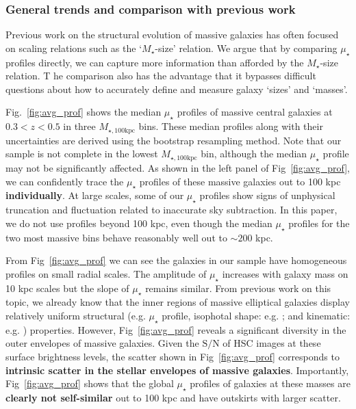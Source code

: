 \documentclass[fleqn,usenatbib]{mnras}
\def\mstar{{$M_{\star}$}}
\def\mtot{{$M_{\star,100\mathrm{kpc}}$}}
\def\s2n{{$\mathrm{S}/\mathrm{N}$}}
\def\mden{{$\mu_{\star}$}}
\begin{document}
\subsubsection{General trends and comparison with previous work}
    \label{sssec:sbp_inter}
   
    Previous work on the structural evolution of massive galaxies has often focused on 
    scaling relations such as the `\mstar{}-size' relation.  
    We argue that by comparing \mden{} profiles directly, we can capture more 
    information than afforded by the \mstar{}-size relation. T
    he comparison also has the advantage that it bypasses difficult questions about 
    how to accurately define and measure galaxy `sizes' and `masses'.
    
    Fig.~\ref{fig:avg_prof} shows the median \mden{} profiles of massive central 
    galaxies at $0.3 < z < 0.5$ in three \mtot{} bins.
    These median profiles along with their uncertainties are derived using the 
    bootstrap resampling method. 
    Note that our sample is not complete in the lowest \mtot{} bin, although the 
    median \mden{} profile may not be significantly affected. 
    As shown in the left panel of Fig~\ref{fig:avg_prof}, we can confidently trace
    the \mden{} profiles of these massive galaxies out to 100 kpc 
    \textbf{individually}.  
    At large scales, some of our \mden{} profiles show signs of unphysical truncation 
    and fluctuation related to inaccurate sky subtraction. 
    In this paper, we do not use profiles beyond 100 kpc, even though the median 
    \mden{} profiles for the two most massive bins behave reasonably well out to 
    ${\sim} 200$ kpc. 
       
    From Fig~\ref{fig:avg_prof} we can see the galaxies in our sample have 
    homogeneous profiles on small radial scales. 
    The amplitude of \mden{} increases with galaxy mass on 10 kpc scales but the 
    slope of \mden{} remains similar.  
    From previous work on this topic, we already know that the inner regions of 
    massive elliptical galaxies display relatively uniform structural (e.g.
    \mden{} profile, isophotal shape: e.g. \citealt{Lauer07, Kormendy2009, 
    Schombert2015}; and kinematic: e.g. \citealt{Cappellari13b}) properties.  
    However, Fig~\ref{fig:avg_prof} reveals a significant diversity in the outer 
    envelopes of massive galaxies.  
    Given the \s2n{} of HSC images at these surface brightness levels, the scatter 
    shown in Fig~\ref{fig:avg_prof} corresponds to \textbf{intrinsic scatter in 
    the stellar envelopes of massive galaxies}. 
    Importantly, Fig~\ref{fig:avg_prof} shows that the global \mden{} profiles 
    of galaxies at these masses are \textbf{clearly not self-similar} out to 100 
    kpc and have outskirts with larger scatter. 
     
\end{document}
